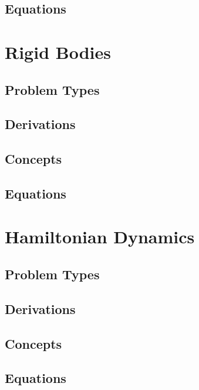 \documentclass[25pt]{book}
\begin{document}
	\section{Equations}
	
	\chapter{Rigid Bodies}
	
	\section{Problem Types}
	
	\section{Derivations}
	
	\section{Concepts}
	
	\section{Equations}
	
	\chapter{Hamiltonian Dynamics}
	
	\section{Problem Types}
	
	\section{Derivations}
	
	\section{Concepts}
	
	\section{Equations}
	
	
\end{document}
